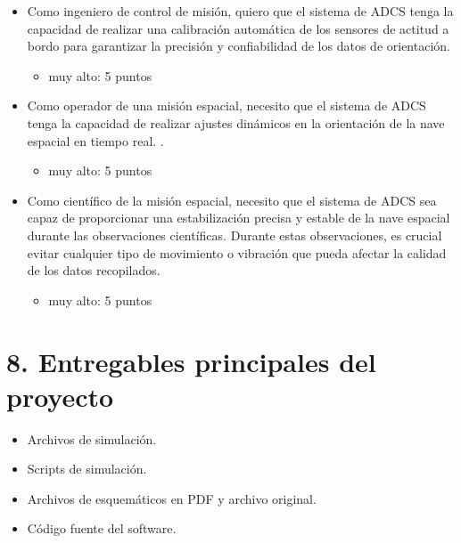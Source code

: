 \documentclass[
11pt, %
]{charter}
\begin{document}
\begin{itemize}

	 \item Como ingeniero de control de misión, quiero que el sistema de ADCS tenga la capacidad de realizar una calibración automática de los sensores de actitud a bordo para garantizar la precisión y confiabilidad de los datos de orientación. 
		\begin{itemize}
			\item muy alto: 5 puntos
		\end{itemize}
	
	
	\item Como operador de una misión espacial, necesito que el sistema de ADCS tenga la capacidad de realizar ajustes dinámicos en la orientación de la nave espacial en tiempo real. .
		\begin{itemize}
			\item muy alto: 5 puntos
		\end{itemize}
	\item Como científico de la misión espacial, necesito que el sistema de ADCS sea capaz de proporcionar una estabilización precisa y estable de la nave espacial durante las observaciones científicas. Durante estas observaciones, es crucial evitar cualquier tipo de movimiento o vibración que pueda afectar la calidad de los datos recopilados. 
		\begin{itemize}
			\item muy alto: 5 puntos
		\end{itemize}
\end{itemize}


\section{8. Entregables principales del proyecto}
\label{sec:entregables}
\begin{itemize}
	\item Archivos de simulación. 
	\item Scripts de simulación. 
	\item Archivos de esquemáticos en PDF y archivo original. 
	\item Código fuente del software. 

\end{itemize}
\end{document}
